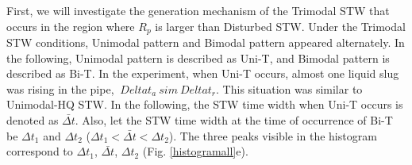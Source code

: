 \documentclass[aps,pre,preprint,groupedaddress,showkeys]{revtex4-2}
\begin{document}
First, we will investigate the generation mechanism of the Trimodal STW that occurs in the region where $ R_p $ is larger than Disturbed STW.
Under the Trimodal STW conditions, Unimodal pattern and Bimodal pattern appeared alternately.
In the following, Unimodal pattern is described as Uni-T, and Bimodal pattern is described as Bi-T.
In the experiment, when Uni-T occurs, almost one liquid slug was rising in the pipe, $ \ Delta t_a \ sim \ Delta t_r $.
This situation was similar to Unimodal-HQ STW.
In the following, the STW time width when Uni-T occurs is denoted as $ \bar {\Delta t} $.
Also, let the STW time width at the time of occurrence of Bi-T be $ \Delta t_1 $ and $ \Delta t_2 $ ($ \Delta t_1 <\bar {\Delta t} <\Delta t_2 $).
The three peaks visible in the histogram correspond to $ \Delta t_1 $, $ \bar {\Delta t} $, $ \Delta t_2 $ (Fig. \ref{histogramall}e).
\end{document}
